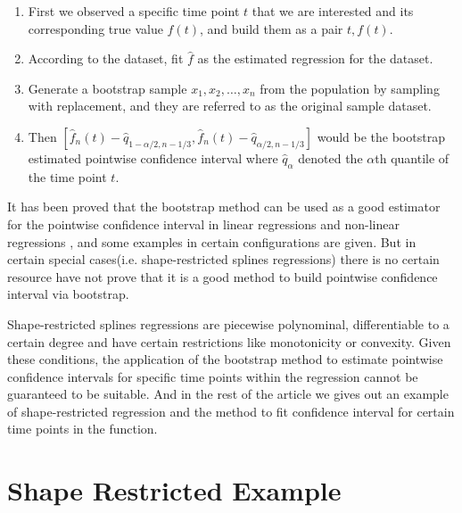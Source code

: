 \documentclass[12pt]{article}
\begin{document}
\begin{enumerate}[label=\arabic*.]
    \item First we observed a specific time point \(t\) that we are interested 
    and its corresponding true value \(f(t)\), and build them as a pair \(t, f(t)\).
    \item According to the dataset, fit \(\hat{f}\) as the estimated regression for
    the dataset.
    \item Generate a bootstrap sample \(x_1, x_2, \ldots, x_n\) from the population
    by sampling with replacement, and they are referred to as the original sample
    dataset. 
    \item Then  
    \( [\hat{f}_n(t) - \hat{q}_{1-\alpha/2,n-1/3}, \hat{f}_n(t) - \hat{q}_{\alpha/2,n-1/3} ]\)
    would be the bootstrap estimated pointwise confidence interval 
    where \(\hat{q}_\alpha\) denoted the \(\alpha\)th quantile of the time point \(t\).

\end{enumerate}





It has been proved that the bootstrap method can be used as a good estimator for
the pointwise confidence interval in linear regressions and non-linear regressions
\cite{efron1979bootstrap}\cite{davidson1999bootstrap}, and some examples in certain
configurations are given.\cite{ruhe2019bootstrap}\cite{ma2019inference}
\cite{dugas2010pointwise} But in certain special cases(i.e. shape-restricted splines 
regressions) there is no certain resource have not prove that it is a good method to
build pointwise confidence interval via bootstrap.

Shape-restricted splines regressions are piecewise polynominal, differentiable to a
certain degree and have certain restrictions like monotonicity or convexity.
\cite{meyer2008inference} Given these conditions, the application of the bootstrap
method to estimate pointwise confidence intervals for specific time points within 
the regression cannot be guaranteed to be suitable. And in the rest of the article
we gives out an example of shape-restricted regression and the method to fit confidence
interval for certain time points in the function.









\section{Shape Restricted Example}
\label{Shape Restricted Example}
\end{document}
